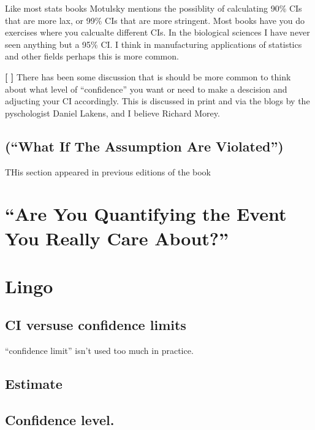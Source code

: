 \documentclass[]{book}
\theoremstyle{definition}
\theoremstyle{definition}
\theoremstyle{definition}
\theoremstyle{remark}
\begin{document}
Like most stats books Motulsky mentions the possiblity of calculating
90\% CIs that are more lax, or 99\% CIs that are more stringent. Most
books have you do exercises where you calcualte different CIs. In the
biological sciences I have never seen anything but a 95\% CI. I think in
manufacturing applications of statistics and other fields perhaps this
is more common.

\textbf{{[} {]}} There has been some discussion that is should be more
common to think about what level of ``confidence'' you want or need to
make a descision and adjucting your CI accordingly. This is discussed in
print and via the blogs by the pyschologist Daniel Lakens, and I believe
Richard Morey.

\subsection{\texorpdfstring{(``What If The Assumption Are
Violated'')}{(What If The Assumption Are Violated)}}\label{what-if-the-assumption-are-violated}

THis section appeared in previous editions of the book

\section{\texorpdfstring{``Are You Quantifying the Event You Really Care
About?''}{Are You Quantifying the Event You Really Care About?}}\label{are-you-quantifying-the-event-you-really-care-about}

\section{Lingo}\label{lingo-1}

\subsection{CI versuse confidence
limits}\label{ci-versuse-confidence-limits}

``confidence limit'' isn't used too much in practice.

\subsection{Estimate}\label{estimate}

\subsection{Confidence level.}\label{confidence-level.}
\end{document}
